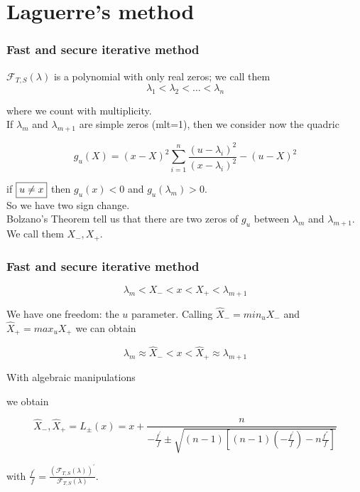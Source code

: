 \documentclass{beamer}
\newcommand{\effe}[2]{\mathcal{F}_{#1}(#2)}
\theoremstyle{definition} \newtheorem{de}{Def}
\theoremstyle{remark} \newtheorem{os}[de]{Oss}
\theoremstyle{plain} \newtheorem{te}[de]{Teo}
\theoremstyle{plain} \newtheorem{co}[de]{Cor}
\theoremstyle{plain} \newtheorem{pr}[de]{Prop}
\theoremstyle{plain} \newtheorem{lem}[de]{Lemm}
\theoremstyle{remark} \newtheorem{rem}[de]{Remark}
\begin{document}
\section{Laguerre's method}

\begin{frame}
\frametitle{Fast and secure iterative method}

$\effe{T,S}{\lambda}$ is a polynomial with only real zeros; we call them
\begin{equation*}
  \lambda_1 < \lambda_2 < \dots < \lambda_n
\end{equation*}

where we count with multiplicity.\\ 
If $\lambda_m$ and $\lambda_{m+1}$ are simple zeros (mlt=1), then we consider now the quadric

\begin{equation*}
  g_{u}(X) = (x-X)^2 \sum_{i=1}^n \frac{(u-\lambda_i)^2}{(x-\lambda_i)^2} - (u-X)^2
\end{equation*}

if $\fbox{$u\neq x$}$ then $g_u(x)<0$ and $g_u(\lambda_m)>0$. \\
So we have two sign change. \\
Bolzano's Theorem tell us that there are two zeros of $g_u$ between $\lambda_m$ and $\lambda_{m+1}$. We call them $X_{-},X_{+}$.

\end{frame}

\begin{frame}
\frametitle{Fast and secure iterative method}

\begin{equation*}
  \lambda_m < X_{-} < x < X_{+} < \lambda_{m+1}
\end{equation*}

We have one freedom: the $u$ parameter. Calling $\hat X_{-}=min_{u} X_{-}$ and $\hat X_{+}=max_{u} X_{+}$  we can obtain


\begin{equation*}
  \lambda_m \approx \hat X_{-} < x < \hat X_{+} \approx \lambda_{m+1}
\end{equation*}

With algebraic manipulations 


we obtain 

\begin{equation*}
  \hat X_{-}, \hat X_{+} = L_{\pm}(x) = x + \frac{ n }{ -\frac{f^{'}}{f} \pm \sqrt{(n-1)[ (n-1)(-\frac{f^{'}}{f}) -n\frac{f^{''}}{f} ]} }
\end{equation*}

with $\frac{f^{'}}{f}=\frac{ (\effe{T,S}{\lambda})^{'} }{ \effe{T,S}{\lambda} }$.

\end{frame}
\end{document}

